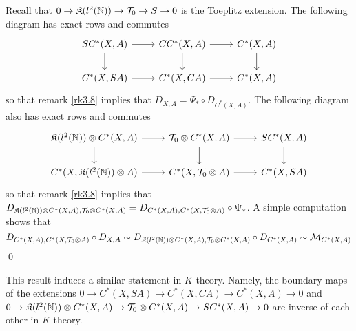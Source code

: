 \begin{dem}
Recall that $0\rightarrow \mathfrak K(l^2(\mathbb N)) \rightarrow \mathcal T_0\rightarrow S\rightarrow 0 $ is the Toeplitz extension. The following diagram has exact rows and commutes
\[\begin{tikzcd} 
SC^*(X,A) \arrow{d}\arrow{r} & CC^*(X,A) \arrow{d}\arrow{r} & C^*(X,A) \arrow{d} \\ 
C^*(X,SA) \arrow{r}          & C^*(X,CA) \arrow{r}          & C^*(X,A)
\end{tikzcd}\]
so that remark \ref{rk3.8} implies that $D_{X,A} = \Psi_*\circ D_{C^*(X,A)}$. The following diagram also has exact rows and commutes
\[\begin{tikzcd} 
\mathfrak K(l^2(\N))\otimes C^*(X,A) \arrow{d}\arrow{r} & \mathcal T_0 \otimes C^*(X,A) \arrow{d}\arrow{r} & SC^*(X,A) \arrow{d} \\ 
C^*(X,\mathfrak K(l^2(\N))\otimes A) \arrow{r}          & C^*(X,\mathcal T_0 \otimes A) \arrow{r}          & C^*(X,SA)
\end{tikzcd}\]
so that remark \ref{rk3.8} implies that $D_{\mathfrak K(l^2(\mathbb N))\otimes C^*(X,A),\mathcal T_0\otimes C^*(X,A)} = D_{C^*(X,A),C^*(X,\mathcal T_0\otimes A)}\circ\Psi_*$. A simple computation shows that 
\[D_{C^*(X,A),C^*(X,\mathcal T_0\otimes A)}\circ D_{X,A} \sim D_{\mathfrak K(l^2(\mathbb N))\otimes C^*(X,A),\mathcal T_0\otimes C^*(X,A)}\circ D_{C^*(X,A)} \sim \mathcal M_{C^*(X,A)}\]
\qed
\end{dem}

\begin{rk}\label{rkInverse} This result induces a similar statement in $K$-theory. %
Namely, the boundary maps of the extensions $0 \rightarrow C^*(X,SA) \rightarrow C^*(X,CA) \rightarrow C^*(X,A) \rightarrow 0$ and
$0 \rightarrow\mathfrak K(l^2(\mathbb N))\otimes C^*(X,A) \rightarrow \mathcal T_0 \otimes C^*(X,A) \rightarrow SC^*(X,A) \rightarrow 0$ are inverse of each other in $K$-theory.
\end{rk}

